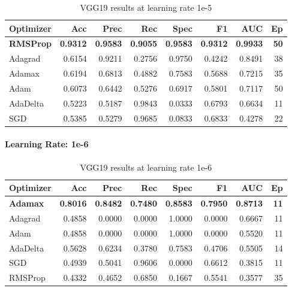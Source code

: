 \begingroup
\tiny
\setlength{\tabcolsep}{2.5pt}
\begin{table}[H]
  \centering
  \caption{VGG19 results at learning rate 1e-5}
  \label{tab:vgg19-1e5}
  \begin{tabular}{l r r r r r r r}
    \toprule
    \rowcolor{tableheader}
    \textbf{Optimizer} & \textbf{Acc} & \textbf{Prec} & \textbf{Rec} &
    \textbf{Spec} & \textbf{F1} & \textbf{AUC} & \textbf{Ep} \\
    \midrule
    \textbf{RMSProp}  & \textbf{0.9312} & \textbf{0.9583} & \textbf{0.9055} & \textbf{0.9583} & \textbf{0.9312} & \textbf{0.9933} & \textbf{50} \\
    Adagrad  & 0.6154 & 0.9211 & 0.2756 & 0.9750 & 0.4242 & 0.8491 & 38 \\
    Adamax   & 0.6194 & 0.6813 & 0.4882 & 0.7583 & 0.5688 & 0.7215 & 35 \\
    Adam     & 0.6073 & 0.6442 & 0.5276 & 0.6917 & 0.5801 & 0.7117 & 50 \\
    AdaDelta & 0.5223 & 0.5187 & 0.9843 & 0.0333 & 0.6793 & 0.6634 & 11 \\
    SGD      & 0.5385 & 0.5279 & 0.9685 & 0.0833 & 0.6833 & 0.4278 & 22 \\
    \bottomrule
  \end{tabular}
\end{table}
\endgroup

\paragraph{Learning Rate: 1e-6}

\begingroup
\tiny
\setlength{\tabcolsep}{2.5pt}
\begin{table}[H]
  \centering
  \caption{VGG19 results at learning rate 1e-6}
  \label{tab:vgg19-1e6}
  \begin{tabular}{l r r r r r r r}
    \toprule
    \rowcolor{tableheader}
    \textbf{Optimizer} & \textbf{Acc} & \textbf{Prec} & \textbf{Rec} &
    \textbf{Spec} & \textbf{F1} & \textbf{AUC} & \textbf{Ep} \\
    \midrule
    \textbf{Adamax}   & \textbf{0.8016} & \textbf{0.8482} & \textbf{0.7480} & \textbf{0.8583} & \textbf{0.7950} & \textbf{0.8713} & \textbf{11} \\
    Adagrad  & 0.4858 & 0.0000 & 0.0000 & 1.0000 & 0.0000 & 0.6667 & 11 \\
    Adam     & 0.4858 & 0.0000 & 0.0000 & 1.0000 & 0.0000 & 0.5520 & 11 \\
    AdaDelta & 0.5628 & 0.6234 & 0.3780 & 0.7583 & 0.4706 & 0.5505 & 14 \\
    SGD      & 0.4939 & 0.5041 & 0.9606 & 0.0000 & 0.6612 & 0.3815 & 11 \\
    RMSProp  & 0.4332 & 0.4652 & 0.6850 & 0.1667 & 0.5541 & 0.3577 & 35 \\
    \bottomrule
  \end{tabular}
\end{table}
\endgroup

